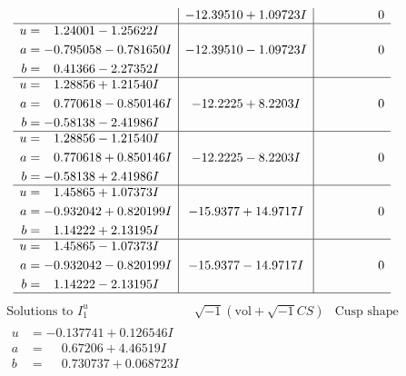 \documentclass[1p]{elsarticle_modified}
\theoremstyle{definition}
\newcommand{\I}{\sqrt{-1}}
\begin{document}
$$\begin{array}{c|c|c}
 & -12.39510 + 1.09723 I & \phantom{-0.000000 } 0 \\ \hline\begin{aligned}
u &= \phantom{-}1.24001 - 1.25622 I \\
a &= -0.795058 - 0.781650 I \\
b &= \phantom{-}0.41366 - 2.27352 I\end{aligned}
 & -12.39510 - 1.09723 I & \phantom{-0.000000 } 0 \\ \hline\begin{aligned}
u &= \phantom{-}1.28856 + 1.21540 I \\
a &= \phantom{-}0.770618 - 0.850146 I \\
b &= -0.58138 - 2.41986 I\end{aligned}
 & -12.2225 + 8.2203 I & \phantom{-0.000000 } 0 \\ \hline\begin{aligned}
u &= \phantom{-}1.28856 - 1.21540 I \\
a &= \phantom{-}0.770618 + 0.850146 I \\
b &= -0.58138 + 2.41986 I\end{aligned}
 & -12.2225 - 8.2203 I & \phantom{-0.000000 } 0 \\ \hline\begin{aligned}
u &= \phantom{-}1.45865 + 1.07373 I \\
a &= -0.932042 + 0.820199 I \\
b &= \phantom{-}1.14222 + 2.13195 I\end{aligned}
 & -15.9377 + 14.9717 I & \phantom{-0.000000 } 0 \\ \hline\begin{aligned}
u &= \phantom{-}1.45865 - 1.07373 I \\
a &= -0.932042 - 0.820199 I \\
b &= \phantom{-}1.14222 - 2.13195 I\end{aligned}
 & -15.9377 - 14.9717 I & \phantom{-0.000000 } 0\\
 \hline 
 \end{array}$$\newpage$$\begin{array}{c|c|c}  
\text{Solutions to }I^u_{1}& \I (\text{vol} + \sqrt{-1}CS) & \text{Cusp shape}\\
 \hline 
\begin{aligned}
u &= -0.137741 + 0.126546 I \\
a &= \phantom{-}0.67206 + 4.46519 I \\
b &= \phantom{-}0.730737 + 0.068723 I\end{aligned}

\end{array}$$
\end{document}
